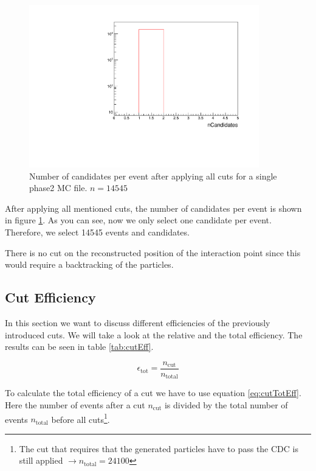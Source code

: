 \documentclass[a4paper,11pt,twosided,final,german,openbib,pdftex,listof=totoc,bibliography=totoc]{scrbook}
\begin{document}
\begin{figure}[h!]
	\centering
	\includegraphics[width=10cm]{Cuts/nCand.pdf}
	\caption[Number Of Candidates Per Event (After All Cuts)]{Number of candidates per event after applying all cuts for a single phase2 MC file. $n = 14545$}	
	\label{fig:nCand}
\end{figure}

After applying all mentioned cuts, the number of candidates per event is shown in figure \ref{fig:nCand}. As you can see, now we only select one candidate per event. Therefore, we select 14545 events and candidates.

There is no cut on the reconstructed position of the interaction point since this would require a backtracking of the particles.




\subsection{Cut Efficiency}

In this section we want to discuss different efficiencies of the previously introduced cuts. We will take a look at the relative and the total efficiency. The results can be seen in table \ref{tab:cutEff}.

\begin{equation}
	\epsilon_{\textrm{tot}} = \frac{n_{\textrm{cut}}}{n_{\textrm{total}}}
	\label{eq:cutTotEff}
\end{equation}

To calculate the total efficiency of a cut we have to use equation \ref{eq:cutTotEff}. Here the number of events after a cut $n_{\textrm{cut}}$ is divided by the total number of events $n_{\textrm{total}}$ before all cuts\footnote{The cut that requires that the generated particles have to pass the CDC is still applied $\rightarrow n_{\textrm{total}} = 24100$}.
\end{document}
